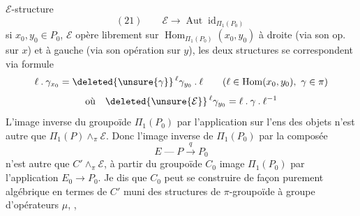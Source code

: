 $\mathcal E$-structure
\[
(21)\qquad \mathcal E\longrightarrow\operatorname{Aut}\operatorname{id}_{\Pi_1(P_0)}
\]
 si $x_0,y_0\in P_0$, $\mathcal E$ opère librement sur
$\operatorname{Hom}_{\Pi_1(P_0)}(x_0,y_0)$ à droite (via son op. sur $x$) et à
gauche (via son opération sur $y$), les deux
structures  se correspondent via 
 formule
\[
\ell\mathbin{.}\gamma_{x_0}=\deleted{\unsure{\gamma}}\,{}^\ell\gamma_{y_0}\mathbin{.}\ell
\qquad(\ell\in\operatorname{Hom}(x_0,y_0),\ \gamma\in\pi)
\]
\[
\text{où}\quad \deleted{\unsure{\mathcal E}}\,{}^\ell\gamma_{y_0}=\ell\mathbin{.}\gamma\mathbin{.}\ell^{-1}
\]
L'image inverse du groupoïde $\Pi_1(P_0)$
par l'application   sur l'ens des objets
n'est autre que $\Pi_1(P)\mathbin{\wedge}_{\pi}\mathcal E$. Donc
l'image inverse de $\Pi_1(P_0)$ par la composée
\[
E\mathbin{\text{---}}P\mathbin{\xrightarrow{q}}P_0
\]
n'est autre que
$C'\mathbin{\wedge}_{\pi}\mathcal E$,
 à partir du groupoïde $C_0$ image
 $\Pi_1(P_0)$ par l'application
 $E_0\longrightarrow P_0$. Je
dis que  $C_0$ peut se construire de
façon purement algébrique en termes de
$C'$ muni des structures de $\pi$-groupoïde à
groupe d'opérateurs $\mu$, , 
